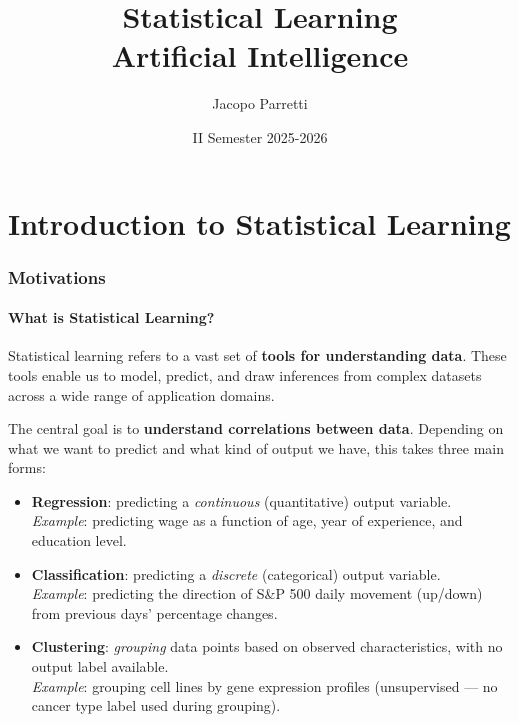 \documentclass[11pt,a4paper]{article}
\title{\textbf{Statistical Learning}\\
\large Artificial Intelligence}
\author{Jacopo Parretti}
\date{II Semester 2025-2026}
\theoremstyle{definition}
\theoremstyle{plain}
\theoremstyle{remark}
\begin{document}
\maketitle
\tableofcontents
\newpage


\part{Introduction to Statistical Learning}

\section{Motivations}

\subsection{What is Statistical Learning?}

\begin{tcolorbox}[colback=blue!5!white,colframe=blue!75!black,title=\textbf{Statistical Learning}]
Statistical learning refers to a vast set of \textbf{tools for understanding data}. These tools enable us to model, predict, and draw inferences from complex datasets across a wide range of application domains.
\end{tcolorbox}

The central goal is to \textbf{understand correlations between data}. Depending on what we want to predict and what kind of output we have, this takes three main forms:

\begin{itemize}
    \item \textbf{Regression}: predicting a \textit{continuous} (quantitative) output variable.\\
    \textit{Example}: predicting wage as a function of age, year of experience, and education level.
    \item \textbf{Classification}: predicting a \textit{discrete} (categorical) output variable.\\
    \textit{Example}: predicting the direction of S\&P 500 daily movement (up/down) from previous days' percentage changes.
    \item \textbf{Clustering}: \textit{grouping} data points based on observed characteristics, with no output label available.\\
    \textit{Example}: grouping cell lines by gene expression profiles (unsupervised — no cancer type label used during grouping).
\end{itemize}
\end{document}
